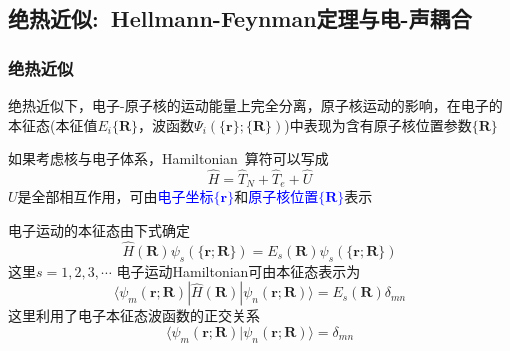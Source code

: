 \subsection{绝热近似:~\rm{Hellmann-Feynman}定理与电-声耦合}
\frame
{
	\frametitle{绝热近似}
	绝热近似下，电子-原子核的运动能量上完全分离，原子核运动的影响，在电子的本征态(本征值$E_i\{\mathbf{R}\}$，波函数$\Psi_i(\{\mathbf{r}\};\{\mathbf{R}\})$)中表现为含有原子核位置参数$\{\mathbf{R}\}$

	如果考虑核与电子体系，\textrm{Hamiltonian~}算符可以写成
	\begin{displaymath}
		\hat H=\hat T_N+\hat T_e+\hat U
	\end{displaymath}
	$U$是全部相互作用，可由\textcolor{blue}{电子坐标$\{\mathbf{r}\}$}和\textcolor{blue}{原子核位置$\{\mathbf{R}\}$}表示

	电子运动的本征态由下式确定
	\begin{displaymath}
		\hat H(\mathbf{R})\psi_s(\{\mathbf{r};\mathbf{R}\})=E_s(\mathbf{R})\psi_s(\{\mathbf{r};\mathbf{R}\})
	\end{displaymath}
	这里$s=1,2,3,\cdots$
	电子运动\textrm{Hamiltonian}可由本征态表示为
	\begin{displaymath}
		\langle\psi_m(\mathbf{r};\mathbf{R})|\hat H(\mathbf{R})|\psi_n(\mathbf{r};\mathbf{R})\rangle=E_s(\mathbf{R})\delta_{mn}
	\end{displaymath}
	这里利用了电子本征态波函数的正交关系
	\begin{displaymath}
		\langle\psi_m(\mathbf{r};\mathbf{R})|\psi_n(\mathbf{r};\mathbf{R})\rangle=\delta_{mn}
	\end{displaymath}
}


